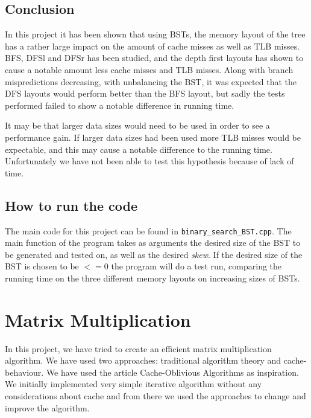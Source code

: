 \documentclass{article}
\begin{document}
\subsection{Conclusion}
In this project it has been shown that using BSTs, the memory layout of the tree has a rather large impact on the amount of cache misses as well as TLB misses. BFS, DFSl and DFSr has been studied, and the depth first layouts has shown to cause a notable amount less cache misses and TLB misses. Along with branch mispredictions decreasing, with unbalancing the BST, it was expected that the DFS layouts would perform better than the BFS layout, but sadly the tests performed failed to show a notable difference in running time.

It may be that larger data sizes would need to be used in order to see a performance gain. If larger data sizes had been used more TLB misses would be expectable, and this may cause a notable difference to the running time. Unfortunately we have not been able to test this hypothesis because of lack of time. 

\subsection{How to run the code}
The main code for this project can be found in \texttt{binary\_search\_BST.cpp}. The main function of the program takes as arguments the desired size of the BST to be generated and tested on, as well as the desired \textit{skew}. If the desired size of the BST is chosen to be $<=0$ the program will do a test run, comparing the running time on the three different memory layouts on increasing sizes of BSTs.

\section{Matrix Multiplication}
In this project, we have tried to create an efficient matrix multiplication algorithm. We have used two approaches: traditional algorithm theory and cache-behaviour. We have used the article Cache-Oblivious Algorithms\cite{frigo-cache} as inspiration. We initially implemented very simple iterative algorithm without any considerations about cache and from there we used the approaches to change and improve the algorithm.
\end{document}
